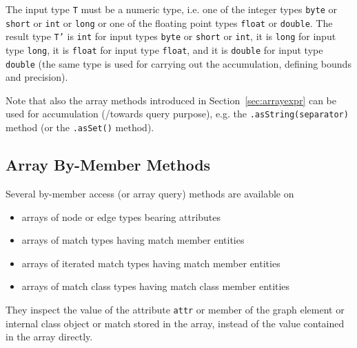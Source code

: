The input type \texttt{T} must be a numeric type, i.e. one of the integer types \texttt{byte} or \texttt{short} or \texttt{int} or \texttt{long} or one of the floating point types \texttt{float} or \texttt{double}. 
The result type \texttt{T'} is \texttt{int} for input types \texttt{byte} or \texttt{short} or \texttt{int}, it is \texttt{long} for input type \texttt{long}, it is \texttt{float} for input type \texttt{float}, and it is \texttt{double} for input type \texttt{double} (the same type is used for carrying out the accumulation, defining bounds and precision).

Note that also the array methods introduced in Section~\ref{sec:arrayexpr} can be used for accumulation (/towards query purpose), e.g. the \texttt{.asString(separator)} method (or the \texttt{.asSet()} method).

\subsection{Array By-Member Methods} 

Several by-member access (or array query) methods are available on 

\begin{itemize}
	\item arrays of node or edge types bearing attributes
	\item arrays of match types having match member entities
	\item arrays of iterated match types having match member entities
	\item arrays of match class types having match class member entities
\end{itemize}

They inspect the value of the attribute \texttt{attr} or member of the graph element or internal class object or match stored in the array, instead of the value contained in the array directly.

